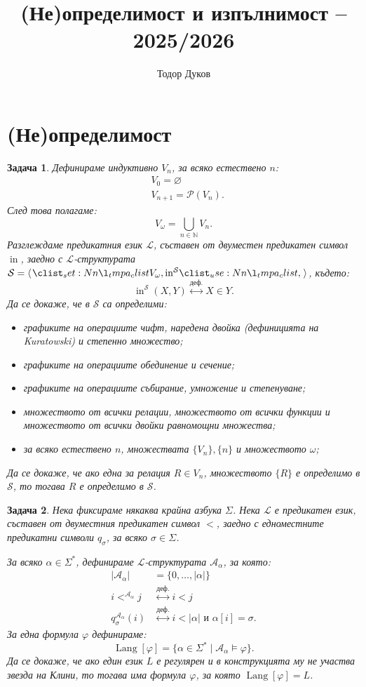 \documentclass[12pt]{article}
\title{(Не)определимост и изпълнимост -- 2025/2026}
\author{Тодор Дуков}
\date{}
\newcommand{\N}{\mathbb{N}}
\newcommand{\calA}{\mathcal{A}}
\newcommand{\calS}{\mathcal{S}}
\newcommand{\calL}{\mathcal{L}}
\newcommand{\calP}{\mathcal{P}}
\newcommand{\dequiv}{\stackrel{\text{деф.}}{\longleftrightarrow}}
\newtheorem{problem}{Задача}[section]
\theoremstyle{definition}
\begin{document}
\maketitle

\section{(Не)определимост}

\begin{problem}
Дефинираме индуктивно $V_n$, за всяко естествено $n$:
\begin{align*}
	 & V_0        = \varnothing  \\
	 & V_{n + 1}  = \calP (V_n).
\end{align*}
След това полагаме:
\[
	V_\omega = \bigcup\limits_{n \in \N} V_n.
\]
Разглеждаме предикатния език $\calL$, съставен от двуместен предикатен символ $\operatorname{in}$, заедно с $\calL$-структурата $\calS = \opair{V_\omega, \operatorname{in}^\calS}$, където:
\[
	\operatorname{in}^\calS(X, Y) \dequiv X \in Y.
\]
Да се докаже, че в $\calS$ са определими:
\begin{itemize}
	\item графиките на операциите чифт, наредена двойка (дефиницията на Kuratowski) и степенно множество;
	\item графиките на операциите обединение и сечение;
	\item графиките на операциите събирание, умножение и степенуване;
	\item множеството от всички релации, множеството от всички функции и множеството от всички двойки равномощни множества;
	\item за всяко естествено $n$, множествата $\{ V_n \}, \{ n \}$ и множеството $\omega$;
\end{itemize}
Да се докаже, че ако една за релация $R \in V_n$, множеството $\{ R \}$ е определимо в $\calS$, то тогава $R$ е определимо в $\calS$.
\end{problem}

\begin{problem}
Нека фиксираме някаква крайна азбука $\Sigma$.
Нека $\calL$ е предикатен език, съставен от двуместния предикатен символ $<$, заедно с едноместните предикатни символи $q_\sigma$, за всяко $\sigma \in \Sigma$.

За всяко $\alpha \in \Sigma^*$, дефинираме $\calL$-структурата $\calA_\alpha$, за която:
\begin{align*}
	|\calA_\alpha|             & = \{ 0, \dots, |\alpha| \}                          \\
	i <^{\calA_\alpha} j       & \dequiv i < j                                       \\
	q_\sigma^{\calA_\alpha}(i) & \dequiv i < |\alpha| \text{ и } \alpha[i] = \sigma.
\end{align*}
За една формула $\varphi$ дефинираме:
\[
	\operatorname{Lang}[\varphi] = \{ \alpha \in \Sigma^* \mid \calA_\alpha \models \varphi \}.
\]
Да се докаже, че ако един език $L$ е регулярен и в конструкцията му не участва звезда на Клини, то тогава има формула $\varphi$, за която $\operatorname{Lang}[\varphi] = L$.
\end{problem}
\end{document}
